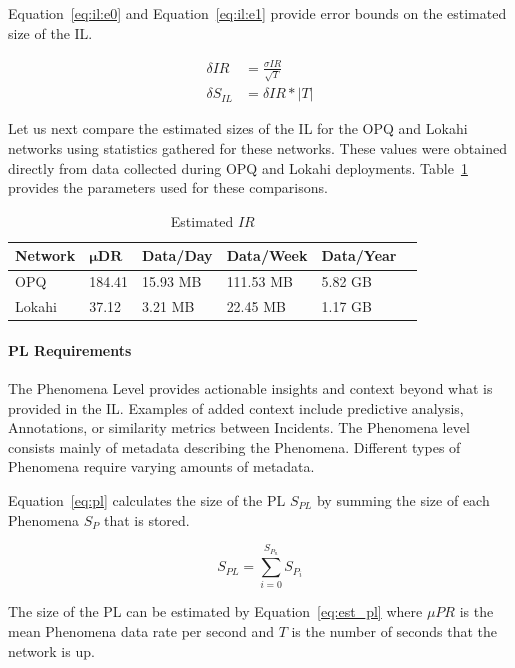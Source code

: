 Equation~\ref{eq:il:e0} and Equation~\ref{eq:il:e1} provide error bounds on the estimated size of the IL\@.

\begin{align}
	\delta IR &= \frac{\sigma IR}{\sqrt{T}} \label{eq:il:e0} \\
	\delta S_{IL} &= \delta IR * |T| \label{eq:il:e1}
\end{align}

Let us next compare the estimated sizes of the IL for the OPQ and Lokahi networks using statistics gathered for these networks. These values were obtained directly from data collected during OPQ and Lokahi deployments. Table~\ref{table:estimated_mu_ir} provides the parameters used for these comparisons.

\begin{table}[H]
	\centering
	\caption{Estimated $IR$}
	\begin{tabularx}{\textwidth}{llllll}
		\toprule
		\textbf{Network} & $\bm{\mu DR}$ & \textbf{Data/Day} & \textbf{Data/Week} & \textbf{Data/Year} \\
		\midrule
		OPQ & 184.41 & 15.93 MB & 111.53 MB & 5.82 GB \\
		Lokahi & 37.12 & 3.21 MB & 22.45 MB & 1.17 GB \\
		\bottomrule
	\end{tabularx}
	\label{table:estimated_mu_ir}
\end{table}

\paragraph{PL Requirements}
The Phenomena Level provides actionable insights and context beyond what is provided in the IL. Examples of added context include predictive analysis, Annotations, or similarity metrics between Incidents. The Phenomena level consists mainly of metadata describing the Phenomena. Different types of Phenomena require varying amounts of metadata.

Equation~\ref{eq:pl} calculates the size of the PL $S_{PL}$ by summing the size of each Phenomena $S_{P}$ that is stored.

\begin{equation}\label{eq:pl}
	S_{PL} = \sum_{i=0}^{S_{P_{n}}} S_{P_{i}}
\end{equation}

The size of the PL can be estimated by Equation~\ref{eq:est_pl} where $\mu PR$ is the mean Phenomena data rate per second and $T$ is the number of seconds that the network is up.

